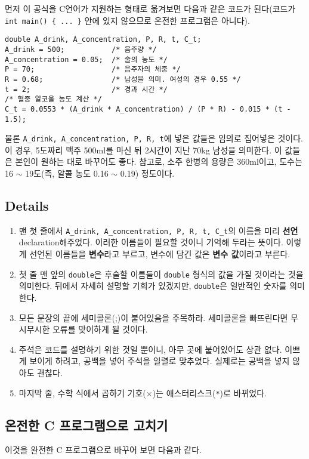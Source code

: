 \documentclass[../main.tex]{subfiles}
\begin{document}
먼저 이 공식을 C언어가 지원하는 형태로 옮겨보면 다음과 같은 코드가
된다(코드가 \texttt{int main() \{ ... \}} 안에 있지 않으므로 온전한
프로그램은 아니다).

\begin{verbatim}
double A_drink, A_concentration, P, R, t, C_t;
A_drink = 500;           /* 음주량 */
A_concentration = 0.05;  /* 술의 농도 */
P = 70;                  /* 음주자의 체중 */
R = 0.68;                /* 남성을 의미. 여성의 경우 0.55 */
t = 2;                   /* 경과 시간 */
/* 혈중 알코올 농도 계산 */
C_t = 0.0553 * (A_drink * A_concentration) / (P * R) - 0.015 * (t - 1.5);
\end{verbatim}

물론 \texttt{A\_drink, A\_concentration, P, R, t}에 넣은 값들은 임의로
집어넣은 것이다. 이 경우, 5도짜리 맥주 500ml를 마신 뒤 2시간이 지난
70kg 남성을 의미한다. 이 값들은 본인이 원하는 대로 바꾸어도
좋다. 참고로, 소주 한병의 용량은 360ml이고, 도수는 16 $\sim$ 19도(즉,
알콜 농도 0.16 $\sim$ 0.19) 정도이다.

\subsection{Details}
\begin{enumerate}
\item 맨 첫 줄에서 \texttt{A\_drink, A\_concentration, P, R, t, C\_t}의
  이름을 미리 \textbf{선언}\small{declaration}해주었다. 이러한 이름들이
  필요할 것이니 기억해 두라는 뜻이다. 이렇게 선언된 이름들을
  \textbf{변수}라고 부르고, 변수에 담긴 값은 \textbf{변수 값}이라고
  부른다.
\item 첫 줄 맨 앞의 \texttt{double}은 후술할 이름들이 \texttt{double}
  형식의 값을 가질 것이라는 것을 의미한다. 뒤에서 자세히 설명할 기회가
  있겠지만, \texttt{double}은 일반적인 숫자를 의미한다.
\item 모든 문장의 끝에 세미콜론(;)이 붙어있음을 주목하라. 세미콜론을
  빠뜨린다면 무시무시한 오류를 맞이하게 될 것이다.
\item 주석은 코드를 설명하기 위한 것일 뿐이니, 아무 곳에 붙어있어도
  상관 없다. 이쁘게 보이게 하려고, 공백을 넣어 주석을 일렬로
  맞추었다. 실제로는 공백을 넣지 않아도 괜찮다.
\item 마지막 줄, 수학 식에서 곱하기 기호($\times$)는
  애스터리스크(\texttt{*})로 바뀌었다.
\end{enumerate}

\label{sec:0.2.2}
\subsection{온전한 C 프로그램으로 고치기}
이것을 완전한 C 프로그램으로 바꾸어 보면 다음과 같다.
\end{document}
